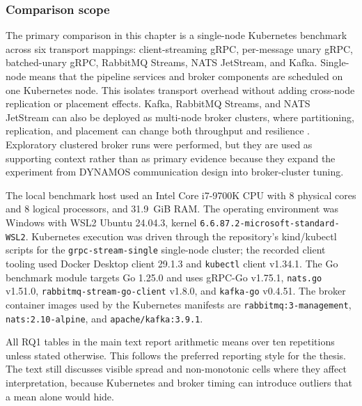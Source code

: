 \subsubsection{Comparison scope}

The primary comparison in this chapter is a single-node Kubernetes benchmark across six transport mappings: client-streaming gRPC, per-message unary gRPC, batched-unary gRPC, RabbitMQ Streams, NATS JetStream, and Kafka. Single-node means that the pipeline services and broker components are scheduled on one Kubernetes node. This isolates transport overhead without adding cross-node replication or placement effects. Kafka, RabbitMQ Streams, and NATS JetStream can also be deployed as multi-node broker clusters, where partitioning, replication, and placement can change both throughput and resilience \cite{kafka2026official,rabbitmq2026streams,nats2026jetstream,nuikka2021cloudnative}. Exploratory clustered broker runs were performed, but they are used as supporting context rather than as primary evidence because they expand the experiment from DYNAMOS communication design into broker-cluster tuning.

The local benchmark host used an Intel Core i7-9700K CPU with 8 physical cores and 8 logical processors, and 31.9~GiB RAM. The operating environment was Windows with WSL2 Ubuntu 24.04.3, kernel \texttt{6.6.87.2-microsoft-standard-WSL2}. Kubernetes execution was driven through the repository's kind/kubectl scripts for the \texttt{grpc-stream-single} single-node cluster; the recorded client tooling used Docker Desktop client 29.1.3 and \texttt{kubectl} client v1.34.1. The Go benchmark module targets Go 1.25.0 and uses gRPC-Go v1.75.1, \texttt{nats.go} v1.51.0, \texttt{rabbitmq-stream-go-client} v1.8.0, and \texttt{kafka-go} v0.4.51. The broker container images used by the Kubernetes manifests are \texttt{rabbitmq:3-management}, \texttt{nats:2.10-alpine}, and \texttt{apache/kafka:3.9.1}.

All RQ1 tables in the main text report arithmetic means over ten repetitions unless stated otherwise. This follows the preferred reporting style for the thesis. The text still discusses visible spread and non-monotonic cells where they affect interpretation, because Kubernetes and broker timing can introduce outliers that a mean alone would hide.

